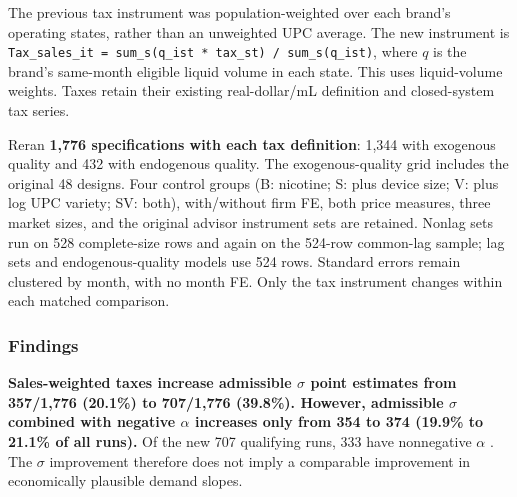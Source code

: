 \documentclass[10pt,]{article}
\begin{document}
The previous tax instrument was population-weighted over each brand's
operating states, rather than an unweighted UPC average. The new
instrument is
\texttt{Tax\_sales\_it\ =\ sum\_s(q\_ist\ *\ tax\_st)\ /\ sum\_s(q\_ist)},
where \(q\) is the brand's same-month eligible liquid volume in each
state. This uses liquid-volume weights. Taxes retain their existing
real-dollar/mL definition and closed-system tax series.

Reran \textbf{1,776 specifications with each tax definition}: 1,344 with
exogenous quality and 432 with endogenous quality. The exogenous-quality
grid includes the original 48 designs. Four control groups (B: nicotine;
S: plus device size; V: plus log UPC variety; SV: both), with/without
firm FE, both price measures, three market sizes, and the original
advisor instrument sets are retained. Nonlag sets run on 528
complete-size rows and again on the 524-row common-lag sample; lag sets
and endogenous-quality models use 524 rows. Standard errors remain
clustered by month, with no month FE. Only the tax instrument changes
within each matched comparison.

\subsubsection{Findings}\label{findings}

\textbf{Sales-weighted taxes increase admissible \(\sigma\) point
estimates from 357/1,776 (20.1\%) to 707/1,776 (39.8\%). However,
admissible \(\sigma\) combined with negative \(\alpha\) increases only
from 354 to 374 (19.9\% to 21.1\% of all runs).} Of the new 707
qualifying runs, 333 have nonnegative \(\alpha\) . The \(\sigma\)
improvement therefore does not imply a comparable improvement in
economically plausible demand slopes.
\end{document}
